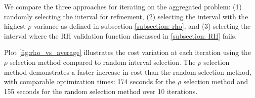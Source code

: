 

  





We compare the three approaches for iterating on the aggregated problem: 
(1) randomly selecting the interval for refinement, 
 (2) selecting the interval with the highest \(\rho\)-variance as defined in subsection \ref{subsection: rho}, and 
 (3) selecting the interval where the RH validation function discussed in \ref{subsection: RH} fails. 

Plot \ref{fig:rho_vs_average} illustrates the cost variation at each iteration using the \(\rho\) selection method compared to random interval selection.
 The \(\rho\) selection method demonstrates a faster increase in cost than the random selection method, with comparable optimization times: 174 seconds for the \(\rho\) selection method 
 and 155 seconds for the random selection method over 10 iterations.

